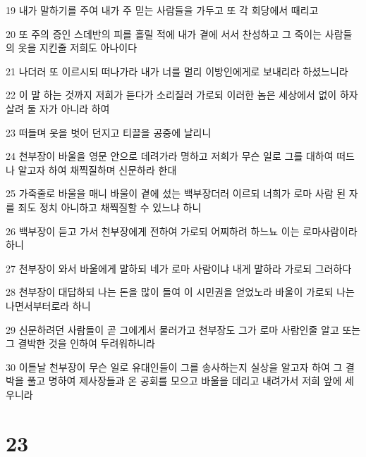 \par 19 내가 말하기를 주여 내가 주 믿는 사람들을 가두고 또 각 회당에서 때리고
\par 20 또 주의 증인 스데반의 피를 흘릴 적에 내가 곁에 서서 찬성하고 그 죽이는 사람들의 옷을 지킨줄 저희도 아나이다
\par 21 나더러 또 이르시되 떠나가라 내가 너를 멀리 이방인에게로 보내리라 하셨느니라
\par 22 이 말 하는 것까지 저희가 듣다가 소리질러 가로되 이러한 놈은 세상에서 없이 하자 살려 둘 자가 아니라 하여
\par 23 떠들며 옷을 벗어 던지고 티끌을 공중에 날리니
\par 24 천부장이 바울을 영문 안으로 데려가라 명하고 저희가 무슨 일로 그를 대하여 떠드나 알고자 하여 채찍질하며 신문하라 한대
\par 25 가죽줄로 바울을 매니 바울이 곁에 섰는 백부장더러 이르되 너희가 로마 사람 된 자를 죄도 정치 아니하고 채찍질할 수 있느냐 하니
\par 26 백부장이 듣고 가서 천부장에게 전하여 가로되 어찌하려 하느뇨 이는 로마사람이라 하니
\par 27 천부장이 와서 바울에게 말하되 네가 로마 사람이냐 내게 말하라 가로되 그러하다
\par 28 천부장이 대답하되 나는 돈을 많이 들여 이 시민권을 얻었노라 바울이 가로되 나는 나면서부터로라 하니
\par 29 신문하려던 사람들이 곧 그에게서 물러가고 천부장도 그가 로마 사람인줄 알고 또는 그 결박한 것을 인하여 두려워하니라
\par 30 이튿날 천부장이 무슨 일로 유대인들이 그를 송사하는지 실상을 알고자 하여 그 결박을 풀고 명하여 제사장들과 온 공회를 모으고 바울을 데리고 내려가서 저희 앞에 세우니라

\chapter{23}


